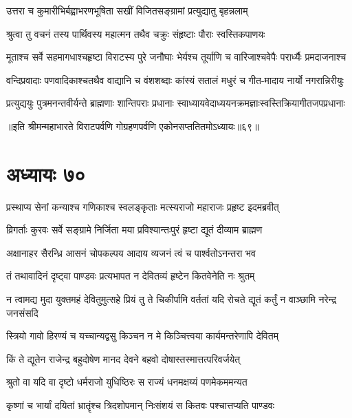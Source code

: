 \twolineshloka
{उत्तरा च कुमारीभिर्बह्वाभरणभूषिता}
{सखीं विजितसङ्ग्रामां प्रत्युद्यातु बृहन्नलाम्}


\twolineshloka
{श्रुत्वा तु वचनं तस्य पार्थिवस्य महात्मन}
{तथैव चक्रुः संहृष्टाः पौराः स्वस्तिकपाणयः}


\twolineshloka
{मूताश्च सर्वे सहमागधाश्चहृष्टा विराटस्य पुरे जनौघाः}
{भेर्यश्च तूर्याणि च वारिजाश्चवेपैः परार्ध्यैः प्रमदाजनाश्च}


\twolineshloka
{वन्दिप्रवादाः पणवादिकाश्चतथैव वाद्यानि च वंशशब्दाः}
{कांस्यं सतालं मधुरं च गीत-मादाय नार्यो नगरान्निरीयुः}


\twolineshloka
{प्रत्युद्ययुः पुत्रमनन्तवीर्यन्ते ब्राह्मणाः शान्तिपराः प्रधानाः}
{स्वाध्यायवेदाध्ययनक्रमज्ञाःस्वस्तिक्रियागीतजपप्रधानाः}

॥इति श्रीमन्महाभारते विराटपर्वणि गोग्रहणपर्वणि एकोनसप्ततितमोऽध्यायः॥६९॥

\chapter{अध्यायः ७०}

\twolineshloka
{प्रस्थाप्य सेनां कन्याश्च गणिकाश्च स्वलङ्कृताः}
{मत्स्यराजो महाराजः प्रहृष्ट इदमब्रवीत्}


\twolineshloka
{व्रिगर्ताः कुरवः सर्वे सङ्ग्रामे निर्जिता मया}
{प्रविश्यान्तःपुरं हृष्टा द्यूतं दीव्याम ब्राह्मण}


\twolineshloka
{अक्षानाहर सैरन्ध्रि आसनं चोपकल्पय}
{आदाय व्यजनं त्वं च पार्श्वतोऽनन्तरा भव}


\twolineshloka
{तं तथावादिनं दृष्ट्वा पाण्डवः प्रत्यभापत}
{न देवितव्यं हृष्टेन कितवेनेति नः श्रुतम्}


\threelineshloka
{न त्वामद्य मुदा युक्तमहं देवितुमुत्सहे}
{प्रियं तु ते चिकीर्पामि वर्ततां यदि रोचते}
{द्यूतं कर्तुं न वाञ्छामि नरेन्द्र जनसंसदि}




\twolineshloka
{स्त्रियो गावो हिरण्यं च यच्चान्यद्वसु किञ्चन}
{न मे किञ्चित्त्वया कार्यमन्तरेणापि देवितम्}




\twolineshloka
{किं ते द्यूतेन राजेन्द्र बहुदोषेण मानद}
{देवने बहवो दोषास्तस्मात्तत्परिवर्जयेत्}


\twolineshloka
{श्रुतो वा यदि वा दृष्टो धर्मराजो युधिष्ठिरः}
{स राज्यं धनमक्षय्यं पणमेकममन्यत}


\twolineshloka
{कृष्णां च भार्यां दयितां भ्रातॄंश्च त्रिदशोपमान्}
{निःसंशयं स कितवः पश्चात्तप्यति पाण्डवः}


